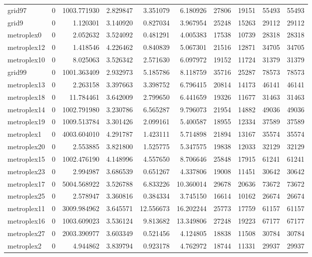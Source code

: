 \begin{longtable}{|l|r|r|r|r|r|r|r|r|r|}
grid97 & 0 & 1003.771930 & 2.829847 & 3.351079 & 6.180926 & 27806 & 19151 & 55493 & 55493 \\
grid9 & 0 & 1.120301 & 3.140920 & 0.827034 & 3.967954 & 25248 & 15263 & 29112 & 29112 \\
metroplex0 & 0 & 2.052632 & 3.524092 & 0.481291 & 4.005383 & 17538 & 10739 & 28318 & 28318 \\
metroplex12 & 0 & 1.418546 & 4.226462 & 0.840839 & 5.067301 & 21516 & 12871 & 34705 & 34705 \\
metroplex10 & 0 & 8.025063 & 3.526342 & 2.571630 & 6.097972 & 19152 & 11724 & 31379 & 31379 \\
grid99 & 0 & 1001.363409 & 2.932973 & 5.185786 & 8.118759 & 35716 & 25287 & 78573 & 78573 \\
metroplex13 & 0 & 2.263158 & 3.397663 & 3.398752 & 6.796415 & 20814 & 14173 & 46141 & 46141 \\
metroplex18 & 0 & 11.784461 & 3.642009 & 2.799650 & 6.441659 & 19326 & 11677 & 31463 & 31463 \\
metroplex14 & 0 & 1002.791980 & 3.230786 & 6.565287 & 9.796073 & 21954 & 14882 & 49036 & 49036 \\
metroplex19 & 0 & 1009.513784 & 3.301426 & 2.099161 & 5.400587 & 18955 & 12334 & 37589 & 37589 \\
metroplex1 & 0 & 4003.604010 & 4.291787 & 1.423111 & 5.714898 & 21894 & 13167 & 35574 & 35574 \\
metroplex20 & 0 & 2.553885 & 3.821800 & 1.525775 & 5.347575 & 19838 & 12033 & 32129 & 32129 \\
metroplex15 & 0 & 1002.476190 & 4.148996 & 4.557650 & 8.706646 & 25848 & 17915 & 61241 & 61241 \\
metroplex23 & 0 & 2.994987 & 3.686539 & 0.651267 & 4.337806 & 19008 & 11451 & 30642 & 30642 \\
metroplex17 & 0 & 5004.568922 & 3.526788 & 6.833226 & 10.360014 & 29678 & 20636 & 73672 & 73672 \\
metroplex25 & 0 & 2.578947 & 3.360816 & 0.384334 & 3.745150 & 16614 & 10162 & 26674 & 26674 \\
metroplex11 & 0 & 3009.984962 & 3.645571 & 12.556673 & 16.202244 & 25773 & 17759 & 61157 & 61157 \\
metroplex16 & 0 & 1003.609023 & 3.536124 & 9.813682 & 13.349806 & 27248 & 19223 & 67177 & 67177 \\
metroplex27 & 0 & 2003.390977 & 3.603349 & 0.521456 & 4.124805 & 18838 & 11508 & 30784 & 30784 \\
metroplex2 & 0 & 4.944862 & 3.839794 & 0.923178 & 4.762972 & 18744 & 11331 & 29937 & 29937 \\

\end{longtable}
